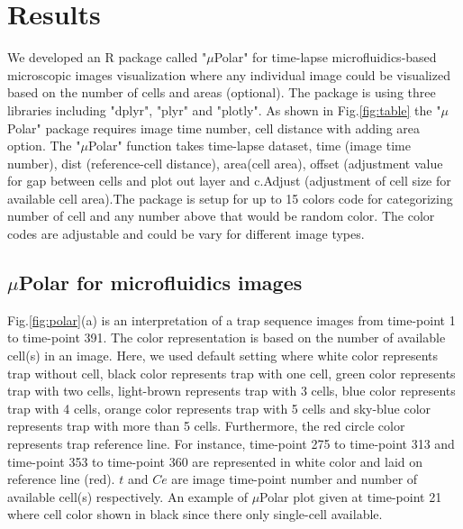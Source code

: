 \documentclass[conference]{IEEEtran}
\begin{document}
 


\section{Results}

We developed an R package called "$\mu$Polar" for time-lapse microfluidics-based microscopic images visualization where any individual image could be visualized based on the number of cells and areas (optional). The package is using three libraries including "dplyr", "plyr" and "plotly". As shown in Fig.\ref{fig:table} the "$\mu$Polar" package requires image time number, cell distance with adding area option. The "$\mu$Polar" function takes time-lapse dataset, time (image time number), dist (reference-cell distance), area(cell area), offset (adjustment value for gap between cells and plot out layer and c.Adjust (adjustment of cell size for available cell area).The package is setup for up to 15 colors code for categorizing number of cell and any number above that would be random color. The color codes are adjustable and could be vary for different image types. 

\subsection{$\mu$Polar for microfluidics images}
Fig.\ref{fig:polar}(a) is an interpretation of a trap sequence images from time-point 1 to time-point 391. The color representation is based on the number of available cell(s) in an image. Here, we used default setting where white color represents trap without cell, black color represents trap with one cell, green color represents trap with two cells, light-brown represents trap with 3 cells, blue color represents trap with 4 cells, orange color represents trap with 5 cells and sky-blue color represents trap with more than 5 cells. Furthermore, the red circle color represents trap reference line. For instance, time-point 275 to time-point 313 and time-point 353 to time-point 360 are represented in white color and laid on reference line (red). $ t  $ and  $ Ce $  are image time-point number and number of available cell(s) respectively. An example of $\mu$Polar plot given at time-point 21 where cell color shown in black since there only single-cell available. 
\end{document}
